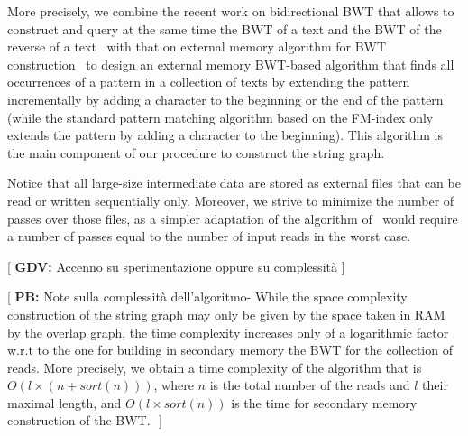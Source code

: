 \documentclass[runningheads,envcountsame,a4paper]{llncs}
\newcommand{\notaestesa}[2]{%
 \marginpar{\color{red!75!black}\textbf{\texttimes}}%
 {\color{red!75!black}%
 [\,\textbullet\,\textsf{\textbf{#1:}} %
 \textsf{\footnotesize#2}\,\textbullet\,]}%
}
\begin{document}
More precisely, we combine the recent work on bidirectional BWT that allows to
construct and query at the same time the BWT of a text and the BWT of the
reverse of a text~\cite{Lam2009} with that on external memory algorithm for BWT
construction~\cite{Bauer2011} to design an external memory BWT-based algorithm
that finds all occurrences of a pattern in a collection of texts by extending
the pattern incrementally by adding a character to the beginning or the end of
the pattern (while the standard pattern matching algorithm based on the FM-index
only extends the pattern by adding a character to the beginning).
This algorithm is the main component of our procedure to construct the string graph.

Notice that all large-size intermediate data are stored as external files that
can be read or written sequentially only.
Moreover, we strive to minimize the number of passes over those files, as a
simpler adaptation of the algorithm of~\cite{Bauer2011} would require a number
of passes equal to the number of input reads in the worst case.

\notaestesa{GDV}{ Accenno su sperimentazione oppure su complessità}
\notaestesa{PB}{
Note sulla complessità dell'algoritmo-
While the space complexity construction of the string graph may only be given by the space taken
in RAM by the overlap graph,  the time complexity increases only of a logarithmic factor w.r.t to the one for building 
in secondary memory the BWT for the collection of reads.
More precisely, we obtain a time complexity of the algorithm that is $O(l \times (n + sort(n)))$, where $n$ is the total number  of the reads and $l$ their maximal length, and $O(l \times  sort(n))$
is the time for secondary memory construction of the BWT.
}





\begin{comment}
--------- non so dove vada-----------------


A key observation in our work is the fact that due to the fact that a
BWT consists of the symbols that precedes the lexicographic ordering of
suffixes of the reads of a collection, it is possible to "walk"
consecutively on the BWT of the collection of reads and of the reversed
version of the reads and then building a forward and backward extension
of a $Q$-substring by symbols of the alphabet lexicographically ordered.
All this can be done entirely using files for each symbol of the
alphabet and files for the BWT and its reversed version.
\end{comment}
\end{document}
